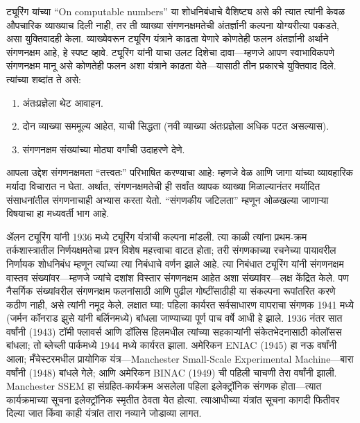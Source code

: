 \begin{digress}
ट्यूरिंग यांच्या ``On computable numbers'' या शोधनिबंधाचे वैशिष्ट्य
असे की त्यात त्यांनी केवळ औपचारिक व्याख्याच दिली नाही, तर ती व्याख्या
संगणनक्षमतेची अंतर्ज्ञानी कल्पना योग्यरीत्या पकडते, असा युक्तिवादही
केला. व्याख्येवरून ट्यूरिंग यंत्राने काढता येणारे कोणतेही फलन अंतर्ज्ञानी
अर्थाने संगणनक्षम आहे, हे स्पष्ट व्हावे. ट्यूरिंग यांनी याचा उलट
दिशेचा दावा---म्हणजे आपण स्वाभाविकपणे संगणनक्षम मानू असे कोणतेही फलन
अशा यंत्राने काढता येते---यासाठी तीन प्रकारचे युक्तिवाद दिले. त्यांच्या
शब्दांत ते असे:
\begin{enumerate}
\item अंतःप्रज्ञेला थेट आवाहन.
\item दोन व्याख्या सममूल्य आहेत, याची सिद्धता (नवी व्याख्या
  अंतःप्रज्ञेला अधिक पटत असल्यास).
\item संगणनक्षम संख्यांच्या मोठ्या वर्गांची उदाहरणे देणे.
\end{enumerate}
आपला उद्देश संगणनक्षमता ``तत्त्वतः'' परिभाषित करण्याचा आहे: म्हणजे
वेळ आणि जागा यांच्या व्यावहारिक मर्यादा विचारात न घेता. अर्थात,
संगणनक्षमतेची ही सर्वांत व्यापक व्याख्या मिळाल्यानंतर मर्यादित
संसाधनांतील संगणनाचाही अभ्यास करता येतो. ``संगणकीय जटिलता'' म्हणून
ओळखल्या जाणाऱ्या विषयाचा हा मध्यवर्ती भाग आहे.
\end{digress}

\begin{history}
ॲलन ट्यूरिंग यांनी 1936 मध्ये ट्यूरिंग यंत्रांची कल्पना मांडली.
त्या काळी त्यांना प्रथम-क्रम तर्कशास्त्रातील निर्णयक्षमतेचा प्रश्न
विशेष महत्त्वाचा वाटत होता; तरी संगणकाच्या रचनेच्या पायावरील निर्णायक
शोधनिबंध म्हणून त्यांच्या त्या निबंधाचे वर्णन झाले आहे. त्या निबंधात
ट्यूरिंग यांनी संगणनक्षम वास्तव संख्यांवर---म्हणजे ज्यांचे दशांश
विस्तार संगणनक्षम आहेत अशा संख्यांवर---लक्ष केंद्रित केले. पण
नैसर्गिक संख्यांवरील संगणनक्षम फलनांसाठी आणि पुढील गोष्टींसाठीही या
संकल्पना रूपांतरित करणे कठीण नाही, असे त्यांनी नमूद केले. लक्षात घ्या:
पहिला कार्यरत सर्वसाधारण वापराचा संगणक 1941 मध्ये (जर्मन कॉनराड
झुसे यांनी बर्लिनमध्ये) बांधला जाण्याच्या पूर्ण पाच
वर्षे आधी हे झाले. 1936 नंतर सात वर्षांनी (1943) टॉमी फ्लावर्स आणि
डॉलिस हिलमधील त्यांच्या सहकाऱ्यांनी संकेतभेदनासाठी कोलॉसस बांधला;
तो ब्लेच्ली पार्कमध्ये 1944 मध्ये कार्यरत झाला.
अमेरिकन ENIAC
(1945) हा नऊ वर्षांनी आला; मँचेस्टरमधील प्रायोगिक
यंत्र---Manchester Small-Scale Experimental Machine---बारा
वर्षांनी (1948) बांधले गेले; आणि अमेरिकन BINAC (1949) ची पहिली
चाचणी तेरा वर्षांनी झाली. Manchester SSEM हा संग्रहित-कार्यक्रम
असलेला पहिला इलेक्ट्रॉनिक संगणक होता---त्यात कार्यक्रमाच्या सूचना
इलेक्ट्रॉनिक स्मृतीत ठेवता येत होत्या. त्याआधीच्या यंत्रांत सूचना
कागदी फितीवर दिल्या जात किंवा काही यंत्रांत तारा नव्याने जोडाव्या लागत.

\end{history}











